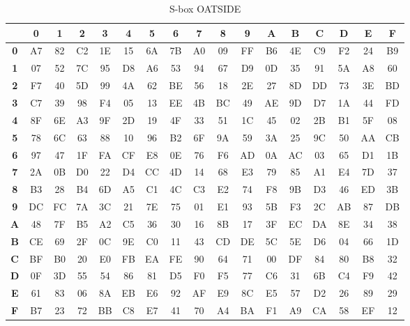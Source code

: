\begin{table}[H]
    \centering
    \scriptsize
    \setlength{\tabcolsep}{3pt}
    \caption{S-box OATSIDE}
    \label{tab:sbox}
    \begin{tabular}{@{}c|cccccccccccccccc@{}}
        & \textbf{0} & \textbf{1} & \textbf{2} & \textbf{3} & \textbf{4} & \textbf{5} & \textbf{6} & \textbf{7} & \textbf{8} & \textbf{9} & \textbf{A} & \textbf{B} & \textbf{C} & \textbf{D} & \textbf{E} & \textbf{F} \\
        \hline
        \textbf{0} & A7 & 82 & C2 & 1E & 15 & 6A & 7B & A0 & 09 & FF & B6 & 4E & C9 & F2 & 24 & B9 \\
        \textbf{1} & 07 & 52 & 7C & 95 & D8 & A6 & 53 & 94 & 67 & D9 & 0D & 35 & 91 & 5A & A8 & 60 \\
        \textbf{2} & F7 & 40 & 5D & 99 & 4A & 62 & BE & 56 & 18 & 2E & 27 & 8D & DD & 73 & 3E & BD \\
        \textbf{3} & C7 & 39 & 98 & F4 & 05 & 13 & EE & 4B & BC & 49 & AE & 9D & D7 & 1A & 44 & FD \\
        \textbf{4} & 8F & 6E & A3 & 9F & 2D & 19 & 4F & 33 & 51 & 1C & 45 & 02 & 2B & B1 & 5F & 08 \\
        \textbf{5} & 78 & 6C & 63 & 88 & 10 & 96 & B2 & 6F & 9A & 59 & 3A & 25 & 9C & 50 & AA & CB \\
        \textbf{6} & 97 & 47 & 1F & FA & CF & E8 & 0E & 76 & F6 & AD & 0A & AC & 03 & 65 & D1 & 1B \\
        \textbf{7} & 2A & 0B & D0 & 22 & D4 & CC & 4D & 14 & 68 & E3 & 79 & 85 & A1 & E4 & 7D & 37 \\
        \textbf{8} & B3 & 28 & B4 & 6D & A5 & C1 & 4C & C3 & E2 & 74 & F8 & 9B & D3 & 46 & ED & 3B \\
        \textbf{9} & DC & FC & 7A & 3C & 21 & 7E & 75 & 01 & E1 & 93 & 5B & F3 & 2C & AB & 87 & DB \\
        \textbf{A} & 48 & 7F & B5 & A2 & C5 & 36 & 30 & 16 & 8B & 17 & 3F & EC & DA & 8E & 34 & 38 \\
        \textbf{B} & CE & 69 & 2F & 0C & 9E & C0 & 11 & 43 & CD & DE & 5C & 5E & D6 & 04 & 66 & 1D \\
        \textbf{C} & BF & B0 & 20 & E0 & FB & EA & FE & 90 & 64 & 71 & 00 & DF & 84 & 80 & B8 & 32 \\
        \textbf{D} & 0F & 3D & 55 & 54 & 86 & 81 & D5 & F0 & F5 & 77 & C6 & 31 & 6B & C4 & F9 & 42 \\
        \textbf{E} & 61 & 83 & 06 & 8A & EB & E6 & 92 & AF & E9 & 8C & E5 & 57 & D2 & 26 & 89 & 29 \\
        \textbf{F} & B7 & 23 & 72 & BB & C8 & E7 & 41 & 70 & A4 & BA & F1 & A9 & CA & 58 & EF & 12 \\
    \end{tabular}
\end{table}

